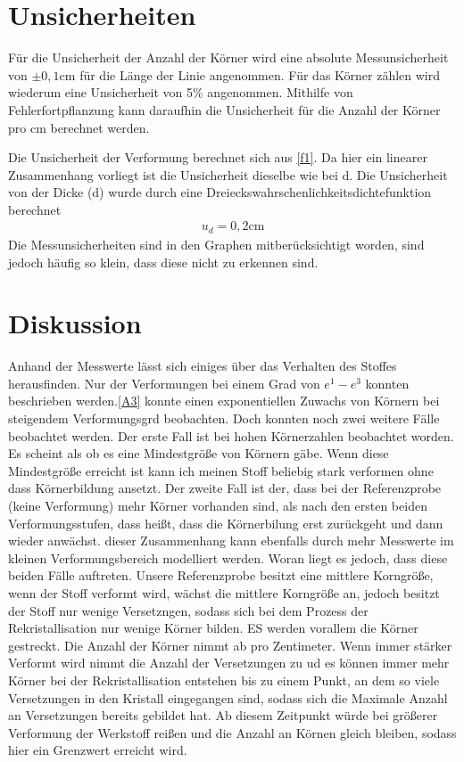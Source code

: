 \documentclass[
	a4paper,
	12pt,
	pagesize,
	ngerman
]{scrartcl}
\begin{document}
\section{Unsicherheiten}
Für die Unsicherheit der Anzahl der Körner wird eine absolute Messunsicherheit von $\pm 0,1$cm für die Länge der Linie angenommen. Für das Körner zählen wird wiederum eine Unsicherheit von 5\% angenommen. Mithilfe von Fehlerfortpflanzung kann daraufhin die Unsicherheit für die Anzahl der Körner pro cm berechnet werden.


Die Unsicherheit der Verformung berechnet sich aus \cref{f1}.
Da hier ein linearer Zusammenhang vorliegt ist die Unsicherheit dieselbe wie bei d. Die Unsicherheit von der Dicke (d) wurde durch eine Dreieckswahrschenlichkeitsdichtefunktion berechnet 
\begin{align*}
    u_d = 0,2\text{cm}
\end{align*}
Die Messunsicherheiten sind in den Graphen mitberücksichtigt worden, sind jedoch häufig so klein, dass diese nicht zu erkennen sind.


\section{Diskussion}
Anhand der Messwerte lässt sich einiges über das Verhalten des Stoffes herausfinden. Nur der Verformungen bei einem Grad von $e^1-e^3$ konnten beschrieben werden.\cref{A3} konnte einen exponentiellen Zuwachs von Körnern bei steigendem Verformungsgrd beobachten. Doch konnten noch zwei weitere Fälle beobachtet werden. Der erste Fall ist bei hohen Körnerzahlen beobachtet worden. Es scheint als ob es eine Mindestgröße von Körnern gäbe. Wenn diese Mindestgröße erreicht ist kann ich meinen Stoff beliebig stark verformen ohne dass Körnerbildung ansetzt. Der zweite Fall ist der, dass bei der Referenzprobe (keine Verformung) mehr Körner vorhanden sind, als nach den ersten beiden Verformungsstufen, dass heißt, dass die Körnerbilung erst zurückgeht und dann wieder anwächst. dieser Zusammenhang kann ebenfalls durch mehr Messwerte im kleinen Verformungsbereich modelliert werden. Woran liegt es jedoch, dass diese beiden Fälle auftreten. Unsere Referenzprobe besitzt eine mittlere Korngröße, wenn der Stoff verformt wird, wächst die mittlere Korngröße an, jedoch besitzt der Stoff nur wenige Versetzngen, sodass sich bei dem Prozess der Rekristallisation nur wenige Körner bilden. ES werden vorallem die Körner gestreckt. Die Anzahl der Körner nimmt ab pro Zentimeter. Wenn immer stärker Verformt wird nimmt die Anzahl der Versetzungen zu ud es können immer mehr Körner bei der Rekristallisation entstehen bis zu einem Punkt, an dem so viele Versetzungen in den Kristall eingegangen sind, sodass sich die Maximale Anzahl an Versetzungen bereits gebildet hat. Ab diesem Zeitpunkt würde bei größerer Verformung der Werkstoff reißen und die Anzahl an Körnen gleich bleiben, sodass hier ein Grenzwert erreicht wird.
\end{document}
